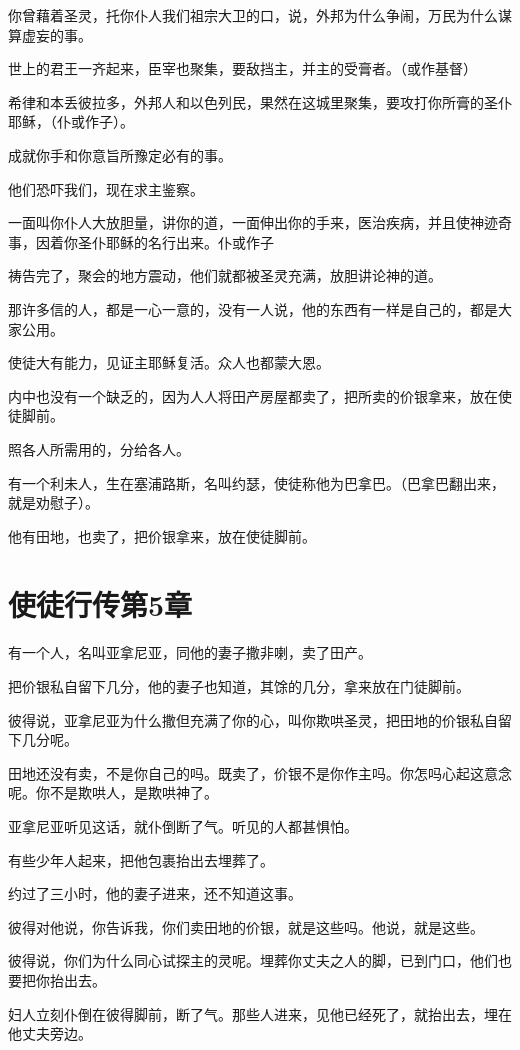\documentclass[12pt,oneside]{book}
\begin{document}
你曾藉着圣灵，托你仆人我们祖宗大卫的口，说，外邦为什么争闹，万民为什么谋算虚妄的事。

世上的君王一齐起来，臣宰也聚集，要敌挡主，并主的受膏者。（或作基督）

希律和本丢彼拉多，外邦人和以色列民，果然在这城里聚集，要攻打你所膏的圣仆耶稣，（仆或作子）。

成就你手和你意旨所豫定必有的事。

他们恐吓我们，现在求主鉴察。

一面叫你仆人大放胆量，讲你的道，一面伸出你的手来，医治疾病，并且使神迹奇事，因着你圣仆耶稣的名行出来。仆或作子

祷告完了，聚会的地方震动，他们就都被圣灵充满，放胆讲论神的道。

那许多信的人，都是一心一意的，没有一人说，他的东西有一样是自己的，都是大家公用。

使徒大有能力，见证主耶稣复活。众人也都蒙大恩。

内中也没有一个缺乏的，因为人人将田产房屋都卖了，把所卖的价银拿来，放在使徒脚前。

照各人所需用的，分给各人。

有一个利未人，生在塞浦路斯，名叫约瑟，使徒称他为巴拿巴。（巴拿巴翻出来，就是劝慰子）。

他有田地，也卖了，把价银拿来，放在使徒脚前。

\chapter{使徒行传第5章}
有一个人，名叫亚拿尼亚，同他的妻子撒非喇，卖了田产。

把价银私自留下几分，他的妻子也知道，其馀的几分，拿来放在门徒脚前。

彼得说，亚拿尼亚为什么撒但充满了你的心，叫你欺哄圣灵，把田地的价银私自留下几分呢。

田地还没有卖，不是你自己的吗。既卖了，价银不是你作主吗。你怎吗心起这意念呢。你不是欺哄人，是欺哄神了。

亚拿尼亚听见这话，就仆倒断了气。听见的人都甚惧怕。

有些少年人起来，把他包裹抬出去埋葬了。

约过了三小时，他的妻子进来，还不知道这事。

彼得对他说，你告诉我，你们卖田地的价银，就是这些吗。他说，就是这些。

彼得说，你们为什么同心试探主的灵呢。埋葬你丈夫之人的脚，已到门口，他们也要把你抬出去。

妇人立刻仆倒在彼得脚前，断了气。那些人进来，见他已经死了，就抬出去，埋在他丈夫旁边。
\end{document}
